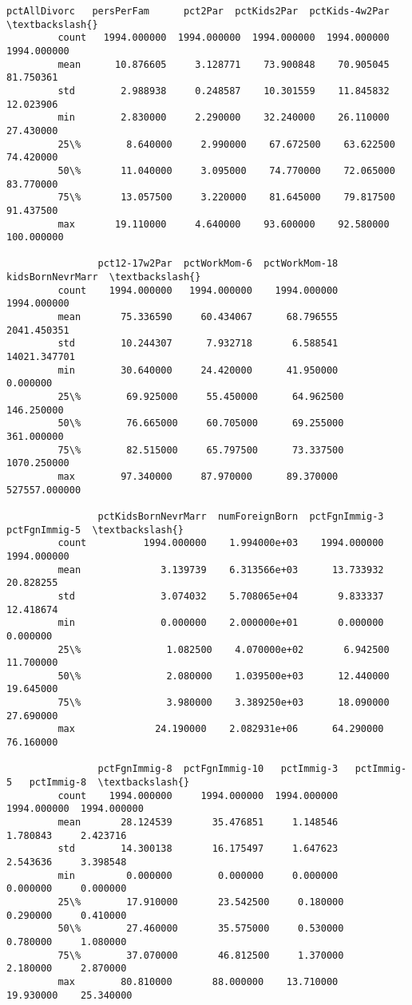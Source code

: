 \documentclass[11pt]{llncs}
\begin{document}
\begin{Verbatim}[commandchars=\\\{\}]
                pctAllDivorc   persPerFam      pct2Par  pctKids2Par  pctKids-4w2Par  \textbackslash{}
         count   1994.000000  1994.000000  1994.000000  1994.000000     1994.000000   
         mean      10.876605     3.128771    73.900848    70.905045       81.750361   
         std        2.988938     0.248587    10.301559    11.845832       12.023906   
         min        2.830000     2.290000    32.240000    26.110000       27.430000   
         25\%        8.640000     2.990000    67.672500    63.622500       74.420000   
         50\%       11.040000     3.095000    74.770000    72.065000       83.770000   
         75\%       13.057500     3.220000    81.645000    79.817500       91.437500   
         max       19.110000     4.640000    93.600000    92.580000      100.000000   
         
                pct12-17w2Par  pctWorkMom-6  pctWorkMom-18  kidsBornNevrMarr  \textbackslash{}
         count    1994.000000   1994.000000    1994.000000       1994.000000   
         mean       75.336590     60.434067      68.796555       2041.450351   
         std        10.244307      7.932718       6.588541      14021.347701   
         min        30.640000     24.420000      41.950000          0.000000   
         25\%        69.925000     55.450000      64.962500        146.250000   
         50\%        76.665000     60.705000      69.255000        361.000000   
         75\%        82.515000     65.797500      73.337500       1070.250000   
         max        97.340000     87.970000      89.370000     527557.000000   
         
                pctKidsBornNevrMarr  numForeignBorn  pctFgnImmig-3  pctFgnImmig-5  \textbackslash{}
         count          1994.000000    1.994000e+03    1994.000000    1994.000000   
         mean              3.139739    6.313566e+03      13.733932      20.828255   
         std               3.074032    5.708065e+04       9.833337      12.418674   
         min               0.000000    2.000000e+01       0.000000       0.000000   
         25\%               1.082500    4.070000e+02       6.942500      11.700000   
         50\%               2.080000    1.039500e+03      12.440000      19.645000   
         75\%               3.980000    3.389250e+03      18.090000      27.690000   
         max              24.190000    2.082931e+06      64.290000      76.160000   
         
                pctFgnImmig-8  pctFgnImmig-10   pctImmig-3   pctImmig-5   pctImmig-8  \textbackslash{}
         count    1994.000000     1994.000000  1994.000000  1994.000000  1994.000000   
         mean       28.124539       35.476851     1.148546     1.780843     2.423716   
         std        14.300138       16.175497     1.647623     2.543636     3.398548   
         min         0.000000        0.000000     0.000000     0.000000     0.000000   
         25\%        17.910000       23.542500     0.180000     0.290000     0.410000   
         50\%        27.460000       35.575000     0.530000     0.780000     1.080000   
         75\%        37.070000       46.812500     1.370000     2.180000     2.870000   
         max        80.810000       88.000000    13.710000    19.930000    25.340000   
         

\end{Verbatim}
\end{document}
